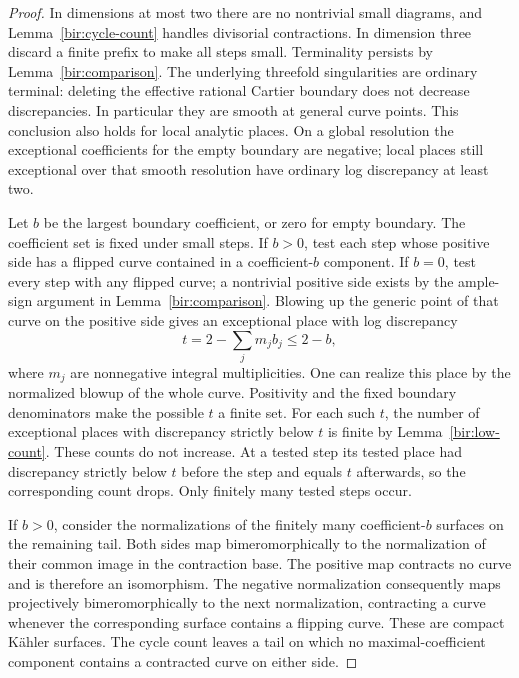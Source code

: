 \begin{proof}
In dimensions at most two there are no nontrivial small diagrams, and
Lemma~\ref{bir:cycle-count} handles divisorial contractions.  In
dimension three discard a finite prefix to make all steps small.
Terminality persists by Lemma~\ref{bir:comparison}.  The underlying
threefold singularities are ordinary terminal: deleting the effective
rational Cartier boundary does not decrease discrepancies.  In
particular they are smooth at general curve points.  This conclusion
also holds for local analytic places.  On a global resolution the
exceptional coefficients for the empty boundary are negative; local
places still exceptional over that smooth resolution have ordinary
log discrepancy at least two.

Let $b$ be the largest boundary coefficient, or zero for empty
boundary.  The coefficient set is fixed under small steps.  If $b>0$,
test each step whose positive side has a flipped curve contained in
a coefficient-$b$ component.  If $b=0$, test every step with any
flipped curve; a nontrivial positive side exists by the ample-sign
argument in Lemma~\ref{bir:comparison}.  Blowing up the generic point
of that curve on the positive side gives an exceptional place with
log discrepancy
\begin{equation}
 t=2-\sum_j m_jb_j\leq2-b,
 \label{bir:terminal-test}
\end{equation}
where $m_j$ are nonnegative integral multiplicities.  One can realize
this place by the normalized blowup of the whole curve.  Positivity
and the fixed boundary denominators make the possible $t$ a finite
set.  For each such $t$, the number of exceptional places with
discrepancy strictly below $t$ is finite by
Lemma~\ref{bir:low-count}.  These counts do not increase.  At a tested
step its tested place had discrepancy strictly below $t$ before the
step and equals $t$ afterwards, so the corresponding count drops.
Only finitely many tested steps occur.

If $b>0$, consider the normalizations of the finitely many
coefficient-$b$ surfaces on the remaining tail.  Both sides map
bimeromorphically to the normalization of their common image in the
contraction base.  The positive map contracts no curve and is
therefore an isomorphism.  The negative normalization consequently
maps projectively bimeromorphically to the next normalization,
contracting a curve whenever the corresponding surface contains a
flipping curve.  These are compact K\"ahler surfaces.  The cycle
count leaves a tail on which no maximal-coefficient component
contains a contracted curve on either side.


\end{proof}
